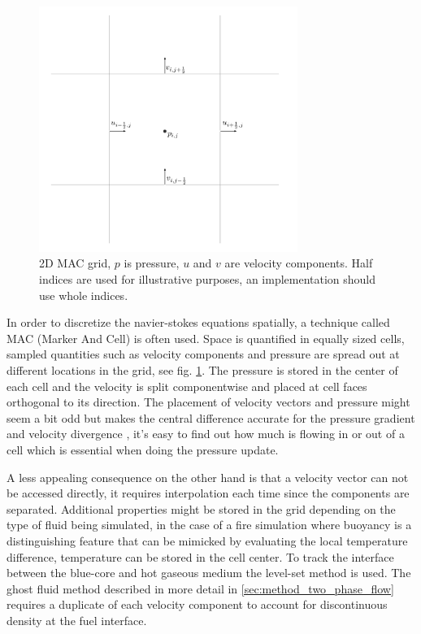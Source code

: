 \begin{figure}[H]
\label{fig:mac-grid}
\centering
\includegraphics[width=0.75\textwidth]{mac.png}
\caption{2D MAC grid, $p$ is pressure, $u$ and $v$ are velocity components. Half indices are used for illustrative purposes, an implementation should use whole indices.}
\end{figure}

In order to discretize the navier-stokes equations spatially, a technique called MAC (Marker And Cell) is often used. Space is quantified in equally sized cells, sampled quantities such as velocity components and pressure are spread out at different locations in the grid, see fig. \ref{fig:mac-grid}. The pressure is stored in the center of each cell and the velocity is split componentwise and placed at cell faces orthogonal to its direction. 
The placement of velocity vectors and pressure might seem a bit odd but makes the central difference accurate for the pressure gradient and velocity divergence \cite{bridson}, it's easy to find out how much is flowing in or out of a cell which is essential when doing the pressure update. 

A less appealing consequence on the other hand is that a velocity vector can not be accessed directly, it requires interpolation each time since the components are separated. Additional properties might be stored in the grid depending on the type of fluid being simulated, in the case of a fire simulation where buoyancy is a distinguishing feature that can be mimicked by evaluating the local temperature difference, temperature can be stored in the cell center. To track the interface between the blue-core and hot gaseous medium the level-set method is used. The ghost fluid method described in more detail in \ref{sec:method_two_phase_flow} requires a duplicate of each velocity component to account for discontinuous density at the fuel interface.


